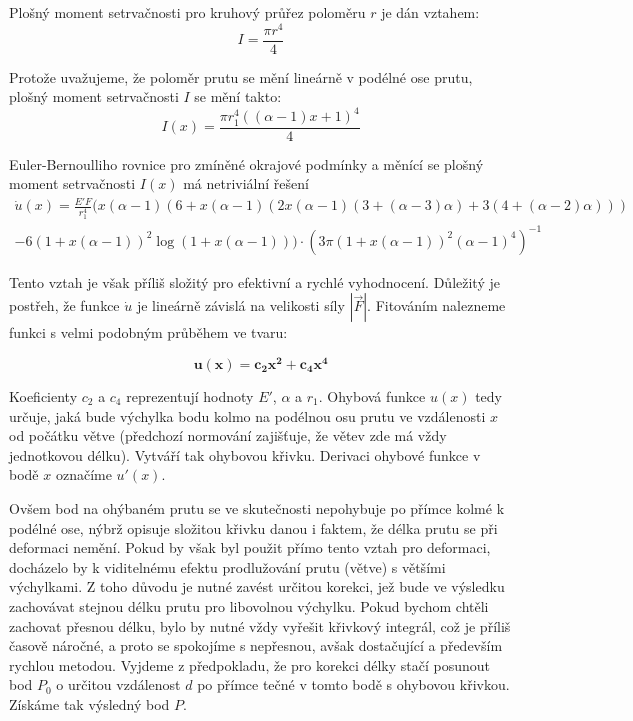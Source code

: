 Plošný moment setrvačnosti pro kruhový průřez poloměru $r$ je dán vztahem:
\begin{equation}
I = \frac{\pi r^4}{4}
\end{equation}

Protože uvažujeme, že poloměr prutu se mění lineárně v podélné ose prutu, plošný moment setrvačnosti $I$ se mění takto:
\begin{equation}
I(x) = \frac{\pi r_{1}^4((\alpha -1)x + 1)^4}{4}
\end{equation}

Euler-Bernoulliho rovnice pro zmíněné okrajové podmínky a měnící se plošný moment setrvačnosti $I(x)$ má netriviální řešení
\begin{multline}
\dot{u}(x)=\frac{{E}'F}{r_{1}^4}(x(\alpha-1)(6+x(\alpha-1)(2x(\alpha-1)(3+(\alpha-3)\alpha)+3(4+(\alpha-2)\alpha)))\\
 - 6 (1+x(\alpha-1))^2 \log (1+x(\alpha-1))) \cdot  (3\pi(1+x(\alpha-1))^2(\alpha-1)^4)^{-1}
\end{multline}

Tento vztah je však příliš složitý pro efektivní a rychlé vyhodnocení. Důležitý je postřeh, že funkce $\dot{u}$ je lineárně závislá na velikosti síly $|\vec{F}|$. Fitováním nalezneme funkci s velmi podobným průběhem ve tvaru:

\begin{equation}
\label{eq:bendFunction}\mathbf{
u(x) = c_2 x^2 + c_4 x^4}
\end{equation}

Koeficienty $c_2$ a $c_4$ reprezentují hodnoty ${E}'$, $\alpha$ a $r_1$. Ohybová funkce $u(x)$ tedy určuje, jaká bude výchylka bodu kolmo na podélnou osu prutu ve vzdálenosti $x$ od počátku větve (předchozí normování zajišťuje, že větev zde má vždy jednotkovou délku). Vytváří tak ohybovou křivku. Derivaci ohybové funkce v bodě $x$ označíme ${u}'(x)$.

Ovšem bod na ohýbaném prutu se ve skutečnosti nepohybuje po přímce kolmé k podélné ose, nýbrž opisuje složitou křivku danou i faktem, že délka prutu se při deformaci nemění. Pokud by však byl použit přímo tento vztah pro deformaci, docházelo by k viditelnému efektu prodlužování prutu (větve) s většími výchylkami. Z toho důvodu je nutné zavést určitou korekci, jež bude ve výsledku zachovávat stejnou délku prutu pro libovolnou výchylku. Pokud bychom chtěli zachovat přesnou délku, bylo by nutné vždy vyřešit křivkový integrál, což je příliš časově náročné, a proto se spokojíme s nepřesnou, avšak dostačující a především rychlou metodou.
Vyjdeme z předpokladu, že pro korekci délky stačí posunout bod $P_0$ o určitou vzdálenost $d$ po přímce tečné v tomto bodě s ohybovou křivkou. Získáme tak výsledný bod $P$. 

